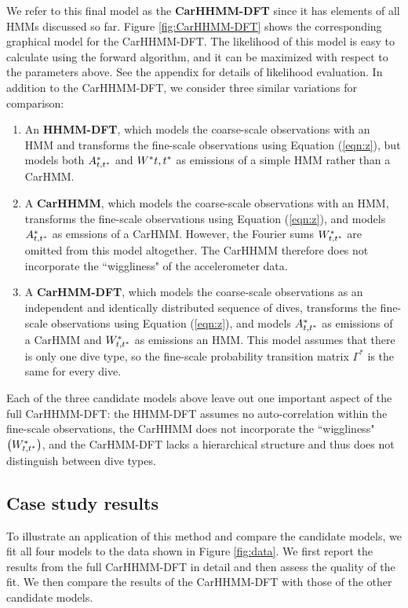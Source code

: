 We refer to this final model as the \textbf{CarHHMM-DFT} since it has elements of all HMMs discussed so far. Figure \ref{fig:CarHHMM-DFT} shows the corresponding graphical model for the CarHHMM-DFT. The likelihood of this model is easy to calculate using the forward algorithm, and it can be maximized with respect to the parameters above. See the appendix for details of likelihood evaluation. In addition to the CarHHMM-DFT, we consider three similar variations for comparison:
\begin{enumerate}
    \item An \textbf{HHMM-DFT}, which models the coarse-scale observations with an HMM and transforms the fine-scale observations using Equation (\ref{eqn:z}), but models both $A^*_{t,t^*}$ and $W^*{t,t^*}$ as emissions of a simple HMM rather than a CarHMM.
    \item A \textbf{CarHHMM}, which models the coarse-scale observations with an HMM, transforms the fine-scale observations using Equation (\ref{eqn:z}), and models $A^*_{t,t^*}$ as emssions of a CarHMM. However, the Fourier sums $W^*_{t,t^*}$ are omitted from this model altogether. The CarHHMM therefore does not incorporate the ``wiggliness" of the accelerometer data.
    \item A \textbf{CarHMM-DFT}, which models the coarse-scale observations as an independent and identically distributed sequence of dives, transforms the fine-scale observations using Equation (\ref{eqn:z}), and models $A^*_{t,t^*}$ as emissions of a CarHMM and $W^*_{t,t^*}$ as emissions an HMM. This model assumes that there is only one dive type, so the fine-scale probability transition matrix $\Gamma^*$ is the same for every dive. 
\end{enumerate}
%
Each of the three candidate models above leave out one important aspect of the full CarHHMM-DFT: the HHMM-DFT assumes no auto-correlation within the fine-scale observations, the CarHHMM does not incorporate the ``wiggliness" $\big(W^*_{t,t^*}\big)$, and the CarHMM-DFT lacks a hierarchical structure and thus does not distinguish between dive types.

\subsection{Case study results}

To illustrate an application of this method and compare the candidate models, we fit all four models to the data shown in Figure \ref{fig:data}. We first report the results from the full CarHHMM-DFT in detail and then assess the quality of the fit. We then compare the results of the CarHHMM-DFT with those of the other candidate models.

